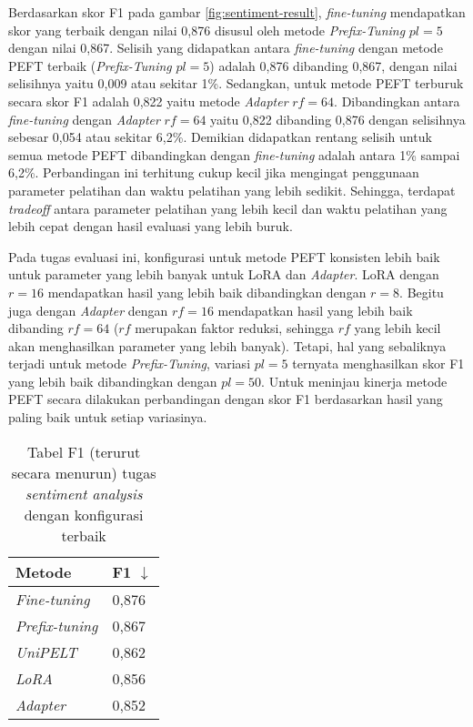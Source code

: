 Berdasarkan skor F1 pada gambar \ref{fig:sentiment-result}, \textit{fine-tuning} mendapatkan skor yang terbaik dengan nilai 0,876 disusul oleh metode \textit{Prefix-Tuning} $pl=5$ dengan nilai 0,867. Selisih yang didapatkan antara \textit{fine-tuning} dengan metode PEFT terbaik (\textit{Prefix-Tuning} $pl=5$) adalah 0,876 dibanding 0,867, dengan nilai selisihnya yaitu 0,009 atau sekitar 1\%. Sedangkan, untuk metode PEFT terburuk secara skor F1 adalah 0,822 yaitu metode \textit{Adapter} $rf=64$. Dibandingkan antara \textit{fine-tuning} dengan \textit{Adapter} $rf=64$ yaitu 0,822 dibanding 0,876 dengan selisihnya sebesar 0,054 atau sekitar 6,2\%. Demikian didapatkan rentang selisih untuk semua metode PEFT dibandingkan dengan \textit{fine-tuning} adalah antara 1\% sampai 6,2\%. Perbandingan ini terhitung cukup kecil jika mengingat penggunaan parameter pelatihan dan waktu pelatihan yang lebih sedikit. Sehingga, terdapat \textit{tradeoff} antara parameter pelatihan yang lebih kecil dan waktu pelatihan yang lebih cepat dengan hasil evaluasi yang lebih buruk.

Pada tugas evaluasi ini, konfigurasi untuk metode PEFT konsisten lebih baik untuk parameter yang lebih banyak untuk LoRA dan \textit{Adapter}. LoRA dengan $r=16$ mendapatkan hasil yang lebih baik dibandingkan dengan $r=8$. Begitu juga dengan \textit{Adapter} dengan $rf=16$ mendapatkan hasil yang lebih baik dibanding $rf=64$ ($rf$ merupakan faktor reduksi, sehingga $rf$ yang lebih kecil akan menghasilkan parameter yang lebih banyak). Tetapi, hal yang sebaliknya terjadi untuk metode \textit{Prefix-Tuning}, variasi $pl=5$ ternyata menghasilkan skor F1 yang lebih baik dibandingkan dengan $pl=50$. Untuk meninjau kinerja metode PEFT secara dilakukan perbandingan dengan skor F1 berdasarkan hasil yang paling baik untuk setiap variasinya.

\begin{table}[h]
    \centering
    \caption{Tabel F1 (terurut secara menurun) tugas \textit{sentiment analysis} dengan konfigurasi terbaik}
    \label{table:sentiment-result-desc}
    \begin{tabular}{l|l}
        \toprule
        \textbf{Metode} & \textbf{F1 $\downarrow$} \\
        \midrule
        \textit{Fine-tuning} & 0,876 \\
        \textit{Prefix-tuning} & 0,867 \\
        \textit{UniPELT} & 0,862 \\
        \textit{LoRA} & 0,856 \\
        \textit{Adapter} & 0,852 \\
        \bottomrule
    \end{tabular}
\end{table}

